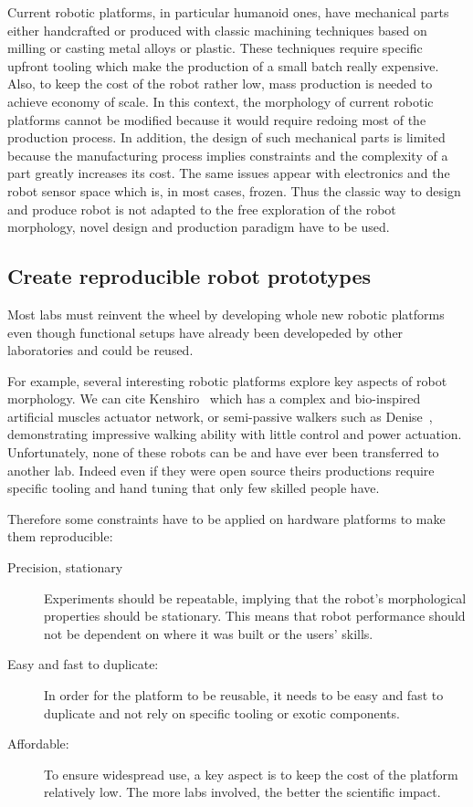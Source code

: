 Current robotic platforms, in particular humanoid ones, have mechanical parts either handcrafted or produced with classic machining techniques based on milling or casting metal alloys or plastic.
These techniques require specific upfront tooling which make the production of a small batch really expensive. Also, to keep the cost of the robot rather low, mass production is needed to achieve economy of scale. In this context, the morphology of current robotic platforms cannot be modified because it would require redoing most of the production process. In addition, the design of such mechanical parts is limited because the manufacturing process implies constraints and the complexity of a part greatly increases its cost. The same issues appear with electronics and the robot sensor space which is, in most cases, frozen. Thus the classic way to design and produce robot is not adapted to the free exploration of the robot morphology, novel design and production paradigm have to be used.


\subsection{Create reproducible robot prototypes} %

Most labs must reinvent the wheel by developing whole new robotic platforms even though functional setups have already been developeded by other laboratories and could be reused.

For example, several interesting robotic platforms explore key aspects of robot morphology. We can cite Kenshiro~\parencite{nakanishi2013design} which has a complex and bio-inspired artificial muscles actuator network, or semi-passive walkers such as Denise~\parencite{wisse2005three}, demonstrating impressive walking ability with little control and power actuation. Unfortunately, none of these robots can be and have ever been transferred to another lab. Indeed even if they were open source theirs productions require specific tooling and hand tuning that only few skilled people have.

Therefore some constraints have to be applied on hardware platforms to make them reproducible:
\begin{description}
    \item[Precision, stationary] Experiments should be repeatable, implying that the robot’s morphological properties should be stationary. This means that robot performance should not be dependent on where it was built or the users’ skills.
    \item[Easy and fast to duplicate:] In order for the platform to be reusable, it needs to be easy and fast to duplicate and not rely on specific tooling or exotic components.
    \item[Affordable:] To ensure widespread use, a key aspect is to keep the cost of the platform relatively low. The more labs involved, the better the scientific impact.
\end{description}



